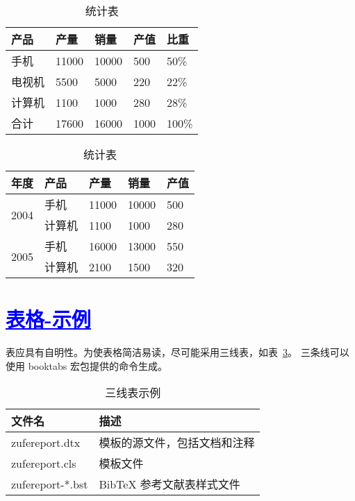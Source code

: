  \begin{table}[htbp]
   \linespread{1.5}
   \songti
   \centering
   \caption{统计表}\label{统计表}
   \begin{tabular}{|l|l|l|l|l|}
   \hline
   产品  & 产量    & 销量    & 产值   & 比重    \\ \hline
   手机  & 11000 & 10000 & 500  & 50\%  \\ \hline
   电视机 & 5500  & 5000  & 220  & 22\%  \\ \hline
   计算机 & 1100  & 1000  & 280  & 28\%  \\ \hline
   合计  & 17600 & 16000 & 1000 & 100\% \\ \hline
   \end{tabular}
 \end{table}

\begin{table}[htbp]
  \linespread{1.5}
  \songti
  \centering
  \caption{统计表}\label{统计表}
  \begin{tabular}{|l|l|l|l|l|}
  \hline
  年度                    & 产品  & 产量    & 销量    & 产值  \\ \hline
  \multirow{2}{*}{2004} & 手机  & 11000 & 10000 & 500 \\ \cline{2-5} 
                      & 计算机 & 1100  & 1000  & 280 \\ \hline
  \multirow{2}{*}{2005} & 手机  & 16000 & 13000 & 550 \\ \cline{2-5} 
                      & 计算机 & 2100  & 1500  & 320 \\ \hline
  \end{tabular}
\end{table}

\section{\textcolor{blue}{\underline{\underline{表格-示例}}}}


表应具有自明性。为使表格简洁易读，尽可能采用三线表，如表~\ref{tab:three-line}。
三条线可以使用 booktabs 宏包提供的命令生成。

\begin{table}[htbp]
	\centering
	\caption{三线表示例}
	\begin{tabular}{ll}
		\toprule
		文件名          & 描述                         \\
		\midrule
		zufereport.dtx   & 模板的源文件，包括文档和注释 \\
		zufereport.cls   & 模板文件                     \\
		zufereport-*.bst & BibTeX 参考文献表样式文件    \\
		\bottomrule
	\end{tabular}
	\label{tab:three-line}
\end{table}


